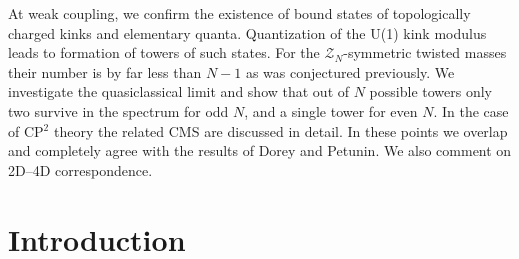 \documentclass[epsfig,12pt]{article}
\newcommand{\mc}[1]{\mathcal{#1}}
\begin{document}
\begin{titlepage}
	At weak coupling, we confirm the existence of bound states 
	of topologically charged kinks and elementary quanta. 
	Quantization of the U(1) kink modulus leads to formation of towers of such states. 
	For the $ \mc{Z}_N $-symmetric twisted masses
	their number is by far less than $ N - 1 $ as was conjectured previously.
	We investigate  the quasiclassical limit and show that out of $ N $ possible towers  
	only two survive in the spectrum for odd $ N $, and a single tower for even $ N $.
	In the case of CP$^2$ theory the related CMS are discussed in detail.
	In these points we overlap and completely agree with the results of  Dorey and Petunin.
We also comment on 2D--4D correspondence. 


\end{titlepage}

\newpage

\tableofcontents

\newpage

\section{Introduction}
\setcounter{equation}{0}
\end{document}
